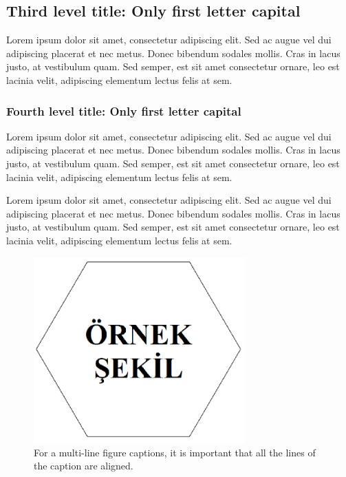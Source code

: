 \subsection{Third level title: Only first letter capital}

Lorem ipsum dolor sit amet, consectetur adipiscing elit. Sed ac augue vel dui 
adipiscing placerat et nec metus. Donec bibendum sodales mollis. Cras in lacus 
justo, at vestibulum quam. Sed semper, est sit amet consectetur ornare, leo est 
lacinia velit, adipiscing elementum lectus felis at sem.

\subsubsection{Fourth level title: Only first letter capital}

Lorem ipsum dolor sit amet, consectetur adipiscing elit. Sed ac augue vel dui 
adipiscing placerat et nec metus. Donec bibendum sodales mollis. Cras in lacus 
justo, at vestibulum quam. Sed semper, est sit amet consectetur ornare, leo est 
lacinia velit, adipiscing elementum lectus felis at sem.


Lorem ipsum dolor sit amet, consectetur adipiscing elit. Sed ac augue vel dui 
adipiscing placerat et nec metus. Donec bibendum sodales mollis. Cras in lacus 
justo, at vestibulum quam. Sed semper, est sit amet consectetur ornare, leo est 
lacinia velit, adipiscing elementum lectus felis at sem.

\begin{figure}
	\centering
	\includegraphics[width=230pt,keepaspectratio=true]{./fig/sekil6}
	\caption{For a multi-line figure captions, it is important that all the
		lines of the caption are aligned.}
	\label{fig:4-1}
\end{figure}

